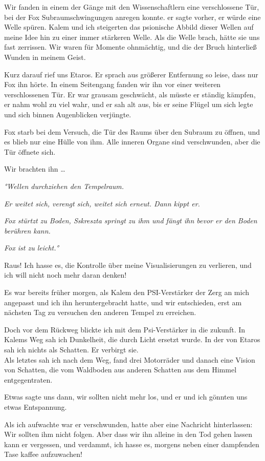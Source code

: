\documentclass[11pt]{article}
\begin{document}
Wir fanden in einem der Gänge mit den Wissenschaftlern eine
verschlossene Tür, bei der Fox Subraumschwingungen anregen konnte. er
sagte vorher, er würde eine Welle spüren. Kalem und ich steigerten das
psionische Abbild dieser Wellen auf meine Idee hin zu einer immer
stärkeren Welle. Als die Welle brach, hätte sie uns fast zerrissen. Wir
waren für Momente ohnmächtig, und die der Bruch hinterließ Wunden in
meinem Geist.

Kurz darauf rief uns Etaros. Er sprach aus größerer Entfernung so leise,
dass nur Fox ihn hörte. In einem Seitengang fanden wir ihn vor einer
weiteren verschlossenen Tür. Er war grausam geschwächt, als müsste er
ständig kämpfen, er nahm wohl zu viel wahr, und er sah alt aus, bis er
seine Flügel um sich legte und sich binnen Augenblicken verjüngte.

Fox starb bei dem Versuch, die Tür des Raums über den Subraum zu öffnen,
und es blieb nur eine Hülle von ihm. Alle inneren Organe sind
verschwunden, aber die Tür öffnete sich.

Wir brachten ihn \ldots{}

\emph{°Wellen durchziehen den Tempelraum.}

\emph{Er weitet sich, verengt sich, weitet sich erneut. Dann kippt er.}

\emph{Fox stürtzt zu Boden, Sskreszta springt zu ihm und fängt ihn bevor
er den Boden berühren kann.}

\emph{Fox ist zu leicht.°}

Raus! Ich hasse es, die Kontrolle über meine Visualisierungen zu
verlieren, und ich will nicht noch mehr daran denken!

Es war bereits früher morgen, als Kalem den PSI-Verstärker der Zerg an
mich angepasst und ich ihn heruntergebracht hatte, und wir entschieden,
erst am nächsten Tag zu versuchen den anderen Tempel zu erreichen.

Doch vor dem Rückweg blickte ich mit dem Psi-Verstärker in die zukunft.
In Kalems Weg sah ich Dunkelheit, die durch Licht ersetzt wurde. In der
von Etaros sah ich nichts als Schatten. Er verbirgt sie.\\ Als letztes
sah ich nach dem Weg, fand drei Motorräder und danach eine Vision von
Schatten, die vom Waldboden aus anderen Schatten aus dem Himmel
entgegentraten.

Etwas sagte uns dann, wir sollten nicht mehr los, und er und ich gönnten
uns etwas Entspannung.

Als ich aufwachte war er verschwunden, hatte aber eine Nachricht
hinterlassen: Wir sollten ihm nicht folgen. Aber dass wir ihn alleine in
den Tod gehen lassen kann er vergessen, und verdammt, ich hasse es,
morgens neben einer dampfenden Tase kaffee aufzuwachen!
\end{document}
